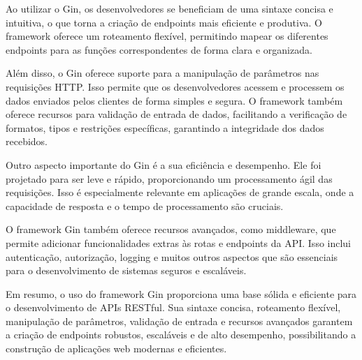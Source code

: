 Ao utilizar o Gin, os desenvolvedores se beneficiam de uma sintaxe concisa e intuitiva, o que torna a criação de endpoints mais eficiente e produtiva. O framework oferece um roteamento flexível, permitindo mapear os diferentes endpoints para as funções correspondentes de forma clara e organizada.

Além disso, o Gin oferece suporte para a manipulação de parâmetros nas requisições HTTP. Isso permite que os desenvolvedores acessem e processem os dados enviados pelos clientes de forma simples e segura. O framework também oferece recursos para validação de entrada de dados, facilitando a verificação de formatos, tipos e restrições específicas, garantindo a integridade dos dados recebidos.

Outro aspecto importante do Gin é a sua eficiência e desempenho. Ele foi projetado para ser leve e rápido, proporcionando um processamento ágil das requisições. Isso é especialmente relevante em aplicações de grande escala, onde a capacidade de resposta e o tempo de processamento são cruciais.

O framework Gin também oferece recursos avançados, como middleware, que permite adicionar funcionalidades extras às rotas e endpoints da API. Isso inclui autenticação, autorização, logging e muitos outros aspectos que são essenciais para o desenvolvimento de sistemas seguros e escaláveis.

Em resumo, o uso do framework Gin proporciona uma base sólida e eficiente para o desenvolvimento de APIs RESTful. Sua sintaxe concisa, roteamento flexível, manipulação de parâmetros, validação de entrada e recursos avançados garantem a criação de endpoints robustos, escaláveis e de alto desempenho, possibilitando a construção de aplicações web modernas e eficientes.
